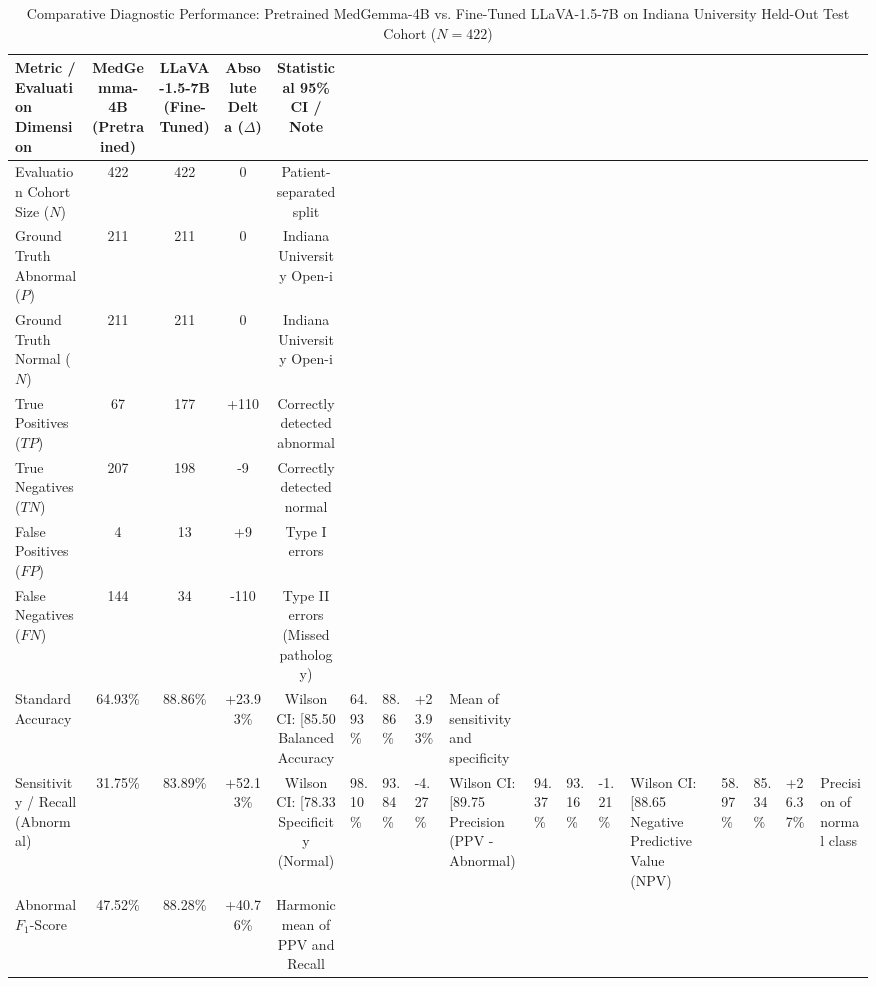 \documentclass{IEEEtran}
\begin{document}
\begin{table}[t]
\centering
\caption{Comparative Diagnostic Performance: Pretrained MedGemma-4B vs. Fine-Tuned LLaVA-1.5-7B on Indiana University Held-Out Test Cohort ($N = 422$)}
\label{tab:cxr_comparison}
\begin{tabular}{lcccc}
\toprule
\textbf{Metric / Evaluation Dimension} & \textbf{MedGemma-4B (Pretrained)} & \textbf{LLaVA-1.5-7B (Fine-Tuned)} & \textbf{Absolute Delta ($\Delta$)} & \textbf{Statistical 95\% CI / Note} \\
\midrule
Evaluation Cohort Size ($N$)           & 422 & 422 & 0 & Patient-separated split \\
Ground Truth Abnormal ($P$)            & 211 & 211 & 0 & Indiana University Open-i \\
Ground Truth Normal ($N$)              & 211 & 211 & 0 & Indiana University Open-i \\
\midrule
True Positives ($TP$)                  & 67 & 177 & +110 & Correctly detected abnormal \\
True Negatives ($TN$)                  & 207 & 198 & -9 & Correctly detected normal \\
False Positives ($FP$)                 & 4 & 13 & +9 & Type I errors \\
False Negatives ($FN$)                 & 144 & 34 & -110 & Type II errors (Missed pathology) \\
\midrule
Standard Accuracy                      & 64.93\% & 88.86\% & +23.93\% & Wilson CI: [85.50%
Balanced Accuracy                      & 64.93\% & 88.86\% & +23.93\% & Mean of sensitivity and specificity \\
Sensitivity / Recall (Abnormal)        & 31.75\% & 83.89\% & +52.13\% & Wilson CI: [78.33%
Specificity (Normal)                   & 98.10\% & 93.84\% & -4.27\% & Wilson CI: [89.75%
Precision (PPV - Abnormal)             & 94.37\% & 93.16\% & -1.21\% & Wilson CI: [88.65%
Negative Predictive Value (NPV)        & 58.97\% & 85.34\% & +26.37\% & Precision of normal class \\
Abnormal $F_1$-Score                   & 47.52\% & 88.28\% & +40.76\% & Harmonic mean of PPV and Recall \\

\end{tabular}
\end{table}
\end{document}
